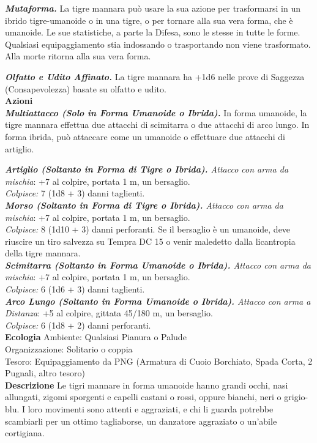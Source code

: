 \begin{multicols}{2}
\emph{\textbf{Mutaforma.}} La tigre mannara può usare la sua azione per trasformarsi in un ibrido tigre-umanoide o in una tigre, o per tornare alla sua vera forma, che è umanoide. Le sue statistiche, a parte la Difesa, sono le stesse in tutte le forme. Qualsiasi equipaggiamento stia indossando o trasportando non viene trasformato. Alla morte ritorna alla sua vera forma.

\emph{\textbf{Olfatto e Udito Affinato.}} La tigre mannara ha +1d6 nelle prove di Saggezza (Consapevolezza) basate su olfatto e udito.\\

\smallskip\textbf{Azioni}\\

\emph{\textbf{Multiattacco (Solo in Forma Umanoide o Ibrida).}} In forma umanoide, la tigre mannara effettua due attacchi di scimitarra o due attacchi di arco lungo. In forma ibrida, può attaccare come un umanoide o effettuare due attacchi di artiglio.

\emph{\textbf{Artiglio (Soltanto in Forma di Tigre o Ibrida).} Attacco con arma da mischia}: +7 al colpire, portata 1 m, un bersaglio.\\
\emph{Colpisce:} 7 (1d8 + 3) danni taglienti.\\

\emph{\textbf{Morso (Soltanto in Forma di Tigre o Ibrida).} Attacco con arma da mischia}: +7 al colpire, portata 1 m, un bersaglio.\\
\emph{Colpisce:} 8 (1d10 + 3) danni perforanti. Se il bersaglio è un umanoide, deve riuscire un tiro salvezza su Tempra DC  15 o venir maledetto dalla licantropia della tigre mannara.\\

\emph{\textbf{Scimitarra (Soltanto in Forma Umanoide o Ibrida).} Attacco con arma da mischia}: +7 al colpire, portata 1 m, un bersaglio.\\
\emph{Colpisce:} 6 (1d6 + 3) danni taglienti.\\

\emph{\textbf{Arco Lungo (Soltanto in Forma Umanoide o Ibrida).} Attacco con arma a Distanza}: +5 al colpire, gittata 45/180 m, un bersaglio.\\

\emph{Colpisce:} 6 (1d8 + 2) danni perforanti.\\
\textbf{Ecologia}
Ambiente: Qualsiasi Pianura o Palude\\
Organizzazione: Solitario o coppia\\
Tesoro: Equipaggiamento da PNG (Armatura di Cuoio Borchiato, Spada Corta, 2 Pugnali, altro tesoro)\\
\textbf{Descrizione}
Le tigri mannare in forma umanoide hanno grandi occhi, nasi allungati, zigomi sporgenti e capelli castani o rossi, oppure bianchi, neri o grigio-blu. I loro movimenti sono attenti e aggraziati, e chi li guarda potrebbe scambiarli per un ottimo tagliaborse, un danzatore aggraziato o un'abile cortigiana.\\


\end{multicols}
